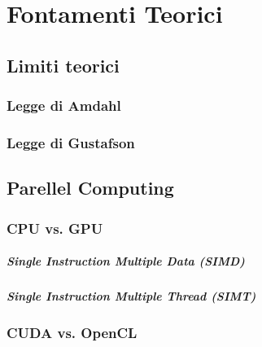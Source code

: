 \chapter{Fontamenti Teorici}
\label{ch:fondamenti}

\section{Limiti teorici}
\label{sec:limiti}

\lipsum[1]

\subsection{Legge di Amdahl}
\label{sec:amdahl}

\lipsum[1]

\subsection{Legge di Gustafson}
\label{sec:gustafson}

\lipsum[1]

\section{Parellel Computing}
\label{sec:cpuvsgpu}

\subsection{CPU vs. GPU}
\label{subsec:cpuvsgpu}

\paragraph{Single Instruction Multiple Data (SIMD)}
\label{para:simd}

\paragraph{Single Instruction Multiple Thread (SIMT)}
\label{para:simt}

\lipsum[1]

\subsection{CUDA vs. OpenCL}
\label{subsec:cudavsopencl}

\lipsum[1]

